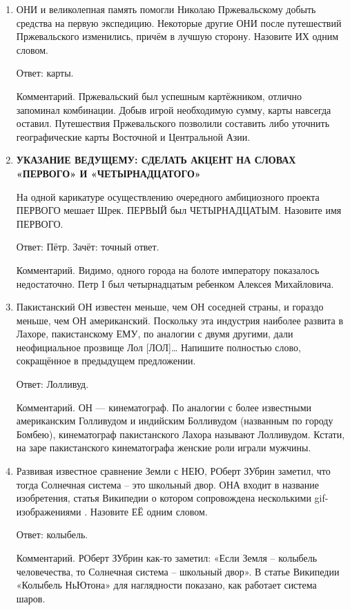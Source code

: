 \documentclass[oneside,final,14pt]{extreport}
\begin{document}
\begin{enumerate}
    \item ОНИ и великолепная память помогли Николаю Пржевальскому добыть средства на первую экспедицию. Некоторые другие ОНИ после путешествий Пржевальского изменились, причём в лучшую сторону. Назовите ИХ одним словом.

    Ответ: карты.

    Комментарий. Пржевальский был успешным картёжником, отлично запоминал
    комбинации. Добыв игрой необходимую сумму, карты навсегда оставил. Путешествия Пржевальского позволили составить либо уточнить географические карты Восточной и Центральной Азии.

    \item \textbf{УКАЗАНИЕ ВЕДУЩЕМУ: СДЕЛАТЬ АКЦЕНТ НА СЛОВАХ «ПЕРВОГО» И «ЧЕТЫРНАДЦАТОГО»}

    На одной карикатуре осуществлению очередного амбициозного проекта ПЕРВОГО мешает Шрек. ПЕРВЫЙ был ЧЕТЫРНАДЦАТЫМ. Назовите имя ПЕРВОГО.

    Ответ: Пётр. Зачёт: точный ответ.

    Комментарий. Видимо, одного города на болоте императору показалось недостаточно. Петр I был четырнадцатым ребенком Алексея Михайловича.

    \item Пакистанский ОН известен меньше, чем ОН соседней страны, и гораздо меньше, чем ОН американский. Поскольку эта индустрия наиболее развита в Лахоре, пакистанскому ЕМУ, по аналогии с двумя другими, дали неофициальное прозвище Лол [ЛОЛ]… Напишите полностью слово, сокращённое в предыдущем предложении.

    Ответ: Лолливуд.

    Комментарий. ОН — кинематограф. По аналогии с более известными американским Голливудом и индийским Болливудом (названным по городу Бомбею), кинематограф пакистанского Лахора называют Лолливудом. Кстати, на заре пакистанского кинематографа женские роли играли мужчины.

    \item Развивая известное сравнение Земли с НЕЮ, РОберт ЗУбрин заметил, что тогда Солнечная система – это школьный двор. ОНА входит в название изобретения, статья Википедии о котором сопровождена несколькими gif-изображениями . Назовите ЕЁ одним словом.

    Ответ: колыбель.

    Комментарий. РОберт ЗУбрин как-то заметил: «Если Земля – колыбель человечества, то Солнечная система – школьный двор». В статье Википедии «Колыбель НьЮтона» для наглядности показано, как работает система шаров.


\end{enumerate}
\end{document}
